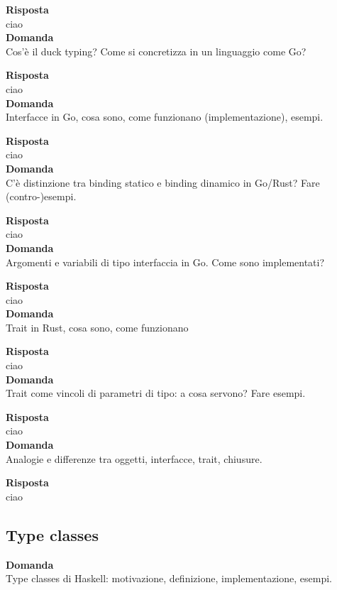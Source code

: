 \documentclass{article}
\begin{document}
\textbf{Risposta}\\
ciao
\vspace{14pt}\\
\textbf{Domanda}\\
Cos’è il duck typing? Come si concretizza in un linguaggio come Go?

\textbf{Risposta}\\
ciao
\vspace{14pt}\\
\textbf{Domanda}\\
Interfacce in Go, cosa sono, come funzionano (implementazione), esempi.

\textbf{Risposta}\\
ciao
\vspace{14pt}\\
\textbf{Domanda}\\
C’è distinzione tra binding statico e binding dinamico in Go/Rust? Fare (contro-)esempi.

\textbf{Risposta}\\
ciao
\vspace{14pt}\\
\textbf{Domanda}\\
Argomenti e variabili di tipo interfaccia in Go. Come sono implementati?

\textbf{Risposta}\\
ciao
\vspace{14pt}\\
\textbf{Domanda}\\
Trait in Rust, cosa sono, come funzionano

\textbf{Risposta}\\
ciao
\vspace{14pt}\\
\textbf{Domanda}\\
Trait come vincoli di parametri di tipo: a cosa servono? Fare esempi.

\textbf{Risposta}\\
ciao
\vspace{14pt}\\
\textbf{Domanda}\\
Analogie e differenze tra oggetti, interfacce, trait, chiusure.

\textbf{Risposta}\\
ciao
\vspace{14pt}\\

\subsection*{Type classes}
\textbf{Domanda}\\
Type classes di Haskell: motivazione, definizione, implementazione, esempi.
\end{document}

